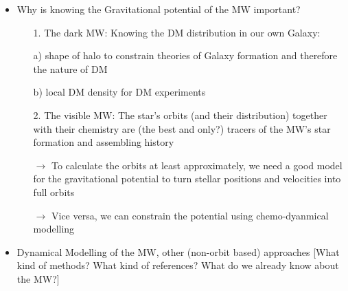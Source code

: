 \begin{itemize}

\item Why is knowing the Gravitational potential of the MW important?
\begin{itemize}
\item[1.] The dark MW: Knowing the DM distribution in our own Galaxy:
\item[a)] shape of halo to constrain theories of Galaxy formation and therefore the nature of DM
\item[b)] local DM density for DM experiments
\item[2.] The visible MW: The star's orbits (and their distribution) together with their chemistry are (the best and only?) tracers of the MW's star formation and assembling history
\item[$\rightarrow$] To calculate the orbits at least approximately, we need a good model for the gravitational potential to turn stellar positions and velocities into full orbits
\item[$\rightarrow$] Vice versa, we can constrain the potential using chemo-dyanmical modelling
\end{itemize}

\item Dynamical Modelling of the MW, other (non-orbit based) approaches [What kind of methods? What kind of references? What do we already know about the MW?]


\end{itemize}
